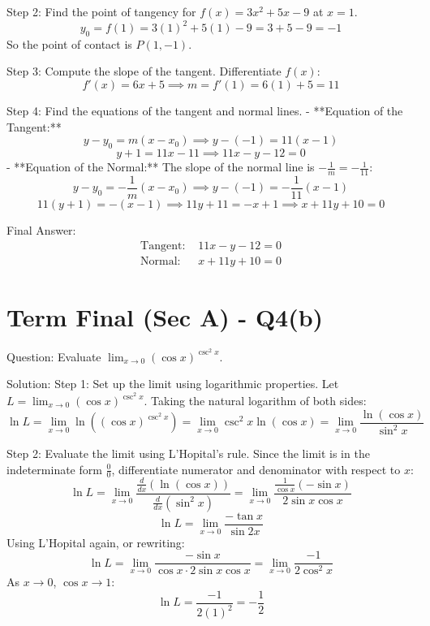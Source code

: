 \documentclass{article}
\begin{document}
Step 2: Find the point of tangency for $f(x) = 3x^2 + 5x - 9$ at $x = 1$.
\[
y_0 = f(1) = 3(1)^2 + 5(1) - 9 = 3 + 5 - 9 = -1
\]
So the point of contact is $P(1, -1)$.

Step 3: Compute the slope of the tangent.
Differentiate $f(x)$:
\[
f'(x) = 6x + 5 \implies m = f'(1) = 6(1) + 5 = 11
\]

Step 4: Find the equations of the tangent and normal lines.
- **Equation of the Tangent:**
  \[
  y - y_0 = m(x - x_0) \implies y - (-1) = 11(x - 1)
  \]
  \[
  y + 1 = 11x - 11 \implies 11x - y - 12 = 0
  \]
- **Equation of the Normal:**
  The slope of the normal line is $-\frac{1}{m} = -\frac{1}{11}$:
  \[
  y - y_0 = -\frac{1}{m}(x - x_0) \implies y - (-1) = -\frac{1}{11}(x - 1)
  \]
  \[
  11(y + 1) = -(x - 1) \implies 11y + 11 = -x + 1 \implies x + 11y + 10 = 0
  \]

Final Answer:
\[
\boxed{
\begin{aligned}
\text{Tangent: } & 11x - y - 12 = 0 \\
\text{Normal: } & x + 11y + 10 = 0
\end{aligned}
}
\]

\section*{Term Final (Sec A) - Q4(b)}
Question:
Evaluate $\lim_{x \to 0} (\cos x)^{\csc^2 x}$.

Solution:
Step 1: Set up the limit using logarithmic properties.
Let $L = \lim_{x \to 0} (\cos x)^{\csc^2 x}$.
Taking the natural logarithm of both sides:
\[
\ln L = \lim_{x \to 0} \ln\left( (\cos x)^{\csc^2 x} \right) = \lim_{x \to 0} \csc^2 x \ln(\cos x) = \lim_{x \to 0} \frac{\ln(\cos x)}{\sin^2 x}
\]

Step 2: Evaluate the limit using L'Hopital's rule.
Since the limit is in the indeterminate form $\frac{0}{0}$, differentiate numerator and denominator with respect to $x$:
\[
\ln L = \lim_{x \to 0} \frac{\frac{d}{dx}(\ln(\cos x))}{\frac{d}{dx}(\sin^2 x)} = \lim_{x \to 0} \frac{\frac{1}{\cos x}(-\sin x)}{2\sin x\cos x}
\]
\[
\ln L = \lim_{x \to 0} \frac{-\tan x}{\sin 2x}
\]
Using L'Hopital again, or rewriting:
\[
\ln L = \lim_{x \to 0} \frac{-\sin x}{\cos x \cdot 2\sin x \cos x} = \lim_{x \to 0} \frac{-1}{2\cos^2 x}
\]
As $x \to 0$, $\cos x \to 1$:
\[
\ln L = \frac{-1}{2(1)^2} = -\frac{1}{2}
\]
\end{document}
